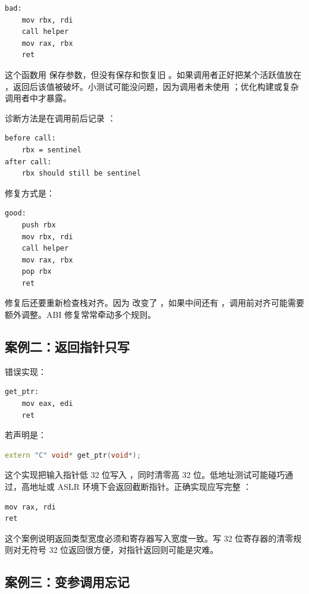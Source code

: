 \begin{lstlisting}
bad:
    mov rbx, rdi
    call helper
    mov rax, rbx
    ret
\end{lstlisting}

这个函数用  保存参数，但没有保存和恢复旧 。如果调用者正好把某个活跃值放在 ，返回后该值被破坏。小测试可能没问题，因为调用者未使用 ；优化构建或复杂调用者中才暴露。

诊断方法是在调用前后记录 ：

\begin{lstlisting}
before call:
    rbx = sentinel
after call:
    rbx should still be sentinel
\end{lstlisting}

修复方式是：

\begin{lstlisting}
good:
    push rbx
    mov rbx, rdi
    call helper
    mov rax, rbx
    pop rbx
    ret
\end{lstlisting}

修复后还要重新检查栈对齐。因为  改变了 ，如果中间还有 ，调用前对齐可能需要额外调整。ABI 修复常常牵动多个规则。

\subsection{案例二：返回指针只写 }

错误实现：

\begin{lstlisting}
get_ptr:
    mov eax, edi
    ret
\end{lstlisting}

若声明是：

\begin{lstlisting}[language=C++]
extern "C" void* get_ptr(void*);
\end{lstlisting}

这个实现把输入指针低 32 位写入 ，同时清零高 32 位。低地址测试可能碰巧通过，高地址或 ASLR 环境下会返回截断指针。正确实现应写完整 ：

\begin{lstlisting}
mov rax, rdi
ret
\end{lstlisting}

这个案例说明返回类型宽度必须和寄存器写入宽度一致。写 32 位寄存器的清零规则对无符号 32 位返回很方便，对指针返回则可能是灾难。

\subsection{案例三：变参调用忘记 }

